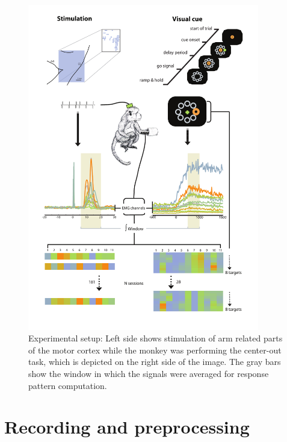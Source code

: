 \begin{figure}[p]
	\centering
		\includegraphics[width=0.9\textwidth]{images/setup.pdf}
	\caption{Experimental setup: Left side shows stimulation of arm related parts of the motor cortex while the monkey was performing the center-out task, which is depicted on the right side of the image. The gray bars show the window in which the signals were averaged for response pattern computation.}
	\label{sg:fig:images_setup}
\end{figure}



%
\section{Recording and preprocessing} %
\label{sg:sec:rec_and_prep}

